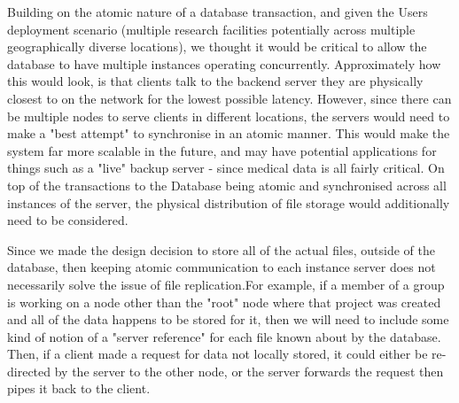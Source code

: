 \documentclass{article}
\begin{document}
Building on the atomic nature of a database transaction, and given the Users deployment scenario (multiple research facilities potentially across multiple geographically diverse locations), we thought it would be critical to allow the database to have multiple instances operating concurrently. Approximately how this would look, is that clients talk to the backend server they are physically closest to on the network for the lowest possible latency. However, since there can be multiple nodes to serve clients in different locations, the servers would need to make a "best attempt" to synchronise in an atomic manner. This would make the system far more scalable in the future, and may have potential applications for things such as a "live" backup server - since medical data is all fairly critical.
On top of the transactions to the Database being atomic and synchronised across all instances of the server, the physical distribution of file storage would additionally need to be considered.

Since we made the design decision to store all of the actual files, outside of the database, then keeping atomic communication to each instance server does not necessarily solve the issue of file replication.For example, if a member of a group is working on a node other than the "root" node where that project was created and all of the data happens to be stored for it, then we will need to include some kind of notion of a "server reference" for each file known about by the database.
Then, if a client made a request for data not locally stored, it could either be re-directed by the server to the other node, or the server forwards the request then pipes it back to the client.
\end{document}
